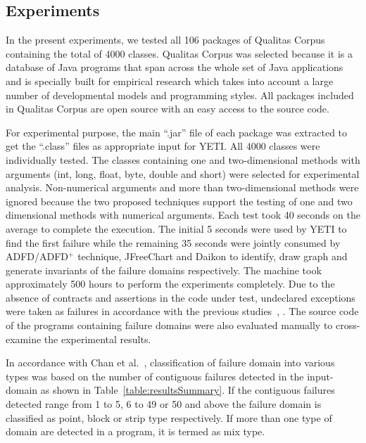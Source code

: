\documentclass[runningheads,a4paper]{llncs}
\begin{document}
\subsection{Experiments}
In the present experiments, we tested all 106 packages of Qualitas Corpus containing the total of 4000 classes. Qualitas Corpus was selected because it is a database of Java programs that span across the whole set of Java applications and is specially built for empirical research which takes into account a large number of developmental models and programming styles. All packages included in Qualitas Corpus are open source with an easy access to the source code.

For experimental purpose, the main ``.jar'' file of each package was extracted to get the ``.class'' files as appropriate input for YETI. All 4000 classes were individually tested. The classes containing one and two-dimensional methods with arguments (int, long, float, byte, double and short) were selected for experimental analysis. Non-numerical arguments and more than two-dimensional methods were ignored because the two proposed techniques support the testing of one and two dimensional methods with numerical arguments. Each test took 40 seconds on the average to complete the execution. The initial 5 seconds were used by YETI to find the first failure while the remaining 35 seconds were jointly consumed by ADFD/ADFD$^+$ technique, JFreeChart and Daikon to identify, draw graph and generate invariants of the failure domains respectively. The machine took approximately 500 hours to perform the experiments completely. Due to the absence of contracts and assertions in the code under test, undeclared exceptions were taken as failures in accordance with the previous studies~\cite{oriol2012random}, \cite{ahmad2013adfd}. The source code of the programs containing failure domains were also evaluated manually to cross-examine the experimental results. 

In accordance with Chan et al.~\cite{chan1996proportional}, classification of failure domain into various types was based on the number of contiguous failures detected in the input-domain as shown in Table~\ref{table:resultsSummary}. If the contiguous failures detected range from 1 to 5, 6 to 49 or 50 and above the failure domain is classified as point, block or strip type respectively. If more than one type of domain are detected in a program, it is termed as mix type. 
\end{document}
